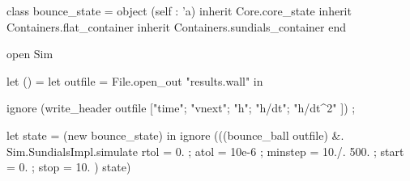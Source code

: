 
class bounce_state = object (self : 'a)
  inherit Core.core_state
  inherit Containers.flat_container
  inherit Containers.sundials_container
end

open Sim

let () = 
  let outfile = File.open_out "results.wall" in
  
  ignore (write_header outfile ["time"; "vnext"; "h"; "h/dt"; "h/dt^2" ])  ;

  let state = (new bounce_state) in
  ignore (((bounce_ball outfile) &. Sim.SundialsImpl.simulate { rtol = 0. ; atol = 10e-6 ; minstep = 10./. 500. ; start = 0. ; stop = 10. }) state)